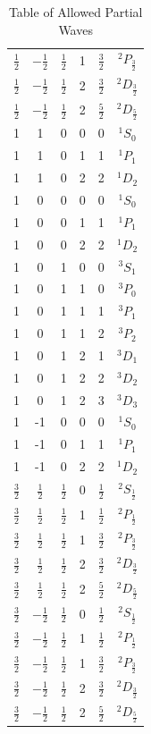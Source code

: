 \documentclass[11pt]{article} %
\begin{document}
\begin{table}[hbt!]
\begin{tabular}{|c|c|c|c|c|c|}
$\frac{1}{2}$ & $-\frac{1}{2}$& $\frac{1}{2}$ & 1 &$ \frac{3}{2}$ & $^{2}P_{\frac{3}{2}}$\\
$\frac{1}{2}$ & $-\frac{1}{2}$& $\frac{1}{2}$ & 2 &$ \frac{3}{2}$ & $^{2}D_{\frac{3}{2}}$\\
$\frac{1}{2}$ & $-\frac{1}{2}$& $\frac{1}{2}$ & 2 &$ \frac{5}{2}$ & $^{2}D_{\frac{5}{2}}$\\
\hline
1 & 1 & 0 & 0 & 0 & $^{1}S_0$\\
1 & 1 & 0 & 1 & 1 & $^{1}P_1$\\
1 & 1 & 0 & 2 & 2 & $^{1}D_2$\\
1 & 0 & 0 & 0 & 0 & $^{1}S_0$\\
1 & 0 & 0 & 1 & 1 & $^{1}P_1$\\
1 & 0 & 0 & 2 & 2 & $^{1}D_2$\\
1 & 0 & 1 & 0 & 0 & $^{3}S_1$\\
1 & 0 & 1 & 1 & 0 & $^{3}P_0$\\
1 & 0 & 1 & 1 & 1 & $^{3}P_1$\\
1 & 0 & 1 & 1 & 2 & $^{3}P_2$\\
1 & 0 & 1 & 2 & 1 & $^{3}D_1$\\
1 & 0 & 1 & 2 & 2 & $^{3}D_2$\\
1 & 0 & 1 & 2 & 3 & $^{3}D_3$\\
1 & -1 & 0 & 0 & 0 & $^{1}S_0$\\
1 & -1 & 0 & 1 & 1 & $^{1}P_1$\\
1 & -1 & 0 & 2 & 2 & $^{1}D_2$\\
\hline
$\frac{3}{2}$ & $\frac{1}{2}$& $\frac{1}{2}$ & 0 &$ \frac{1}{2}$ & $^{2}S_{\frac{1}{2}}$\\

$\frac{3}{2}$ & $\frac{1}{2}$& $\frac{1}{2}$ & 1 &$ \frac{1}{2}$ & $^{2}P_{\frac{1}{2}}$\\

$\frac{3}{2}$ & $\frac{1}{2}$& $\frac{1}{2}$ & 1 &$ \frac{3}{2}$ & $^{2}P_{\frac{3}{2}}$\\
$\frac{3}{2}$ & $\frac{1}{2}$& $\frac{1}{2}$ & 2 &$ \frac{3}{2}$ & $^{2}D_{\frac{3}{2}}$\\
$\frac{3}{2}$ & $\frac{1}{2}$& $\frac{1}{2}$ & 2 &$ \frac{5}{2}$ & $^{2}D_{\frac{5}{2}}$\\
$\frac{3}{2}$ & $-\frac{1}{2}$& $\frac{1}{2}$ & 0 &$ \frac{1}{2}$ & $^{2}S_{\frac{1}{2}}$\\

$\frac{3}{2}$ & $-\frac{1}{2}$& $\frac{1}{2}$ & 1 &$ \frac{1}{2}$ & $^{2}P_{\frac{1}{2}}$\\

$\frac{3}{2}$ & $-\frac{1}{2}$& $\frac{1}{2}$ & 1 &$ \frac{3}{2}$ & $^{2}P_{\frac{3}{2}}$\\
$\frac{3}{2}$ & $-\frac{1}{2}$& $\frac{1}{2}$ & 2 &$ \frac{3}{2}$ & $^{2}D_{\frac{3}{2}}$\\
$\frac{3}{2}$ & $-\frac{1}{2}$& $\frac{1}{2}$ & 2 &$ \frac{5}{2}$ & $^{2}D_{\frac{5}{2}}$\\

\hline
\end{tabular}
\caption{Table of Allowed Partial Waves}
\end{table}
\end{document}
